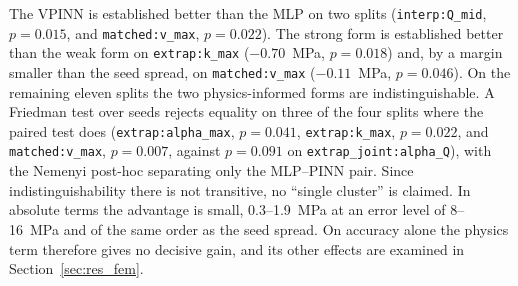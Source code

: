 \documentclass[subscriptcorrection,upint,varvw,barcolor=Goldenrod3,mathalfa=cal=euler,balance,hyphenate,french,pdf-a]{asmejour} %
\begin{document}
The VPINN is established better than the MLP on two splits (\texttt{interp:Q\_mid}, $p=0.015$, and \texttt{matched:v\_max}, $p=0.022$). The strong form is established better than the weak form on \texttt{extrap:k\_max} ($-0.70$~MPa, $p=0.018$) and, by a margin smaller than the seed spread, on \texttt{matched:v\_max} ($-0.11$~MPa, $p=0.046$). On the remaining eleven splits the two physics-informed forms are indistinguishable. A Friedman test over seeds \citep{friedman1937,demsar2006} rejects equality on three of the four splits where the paired test does (\texttt{extrap:alpha\_max}, $p=0.041$, \texttt{extrap:k\_max}, $p=0.022$, and \texttt{matched:v\_max}, $p=0.007$, against $p=0.091$ on \texttt{extrap\_joint:alpha\_Q}), with the Nemenyi post-hoc separating only the MLP--PINN pair. Since indistinguishability there is not transitive, no ``single cluster'' is claimed. In absolute terms the advantage is small, 0.3--1.9~MPa at an error level of 8--16~MPa and of the same order as the seed spread. On accuracy alone the physics term therefore gives no decisive gain, and its other effects are examined in Section~\ref{sec:res_fem}.
\end{document}
